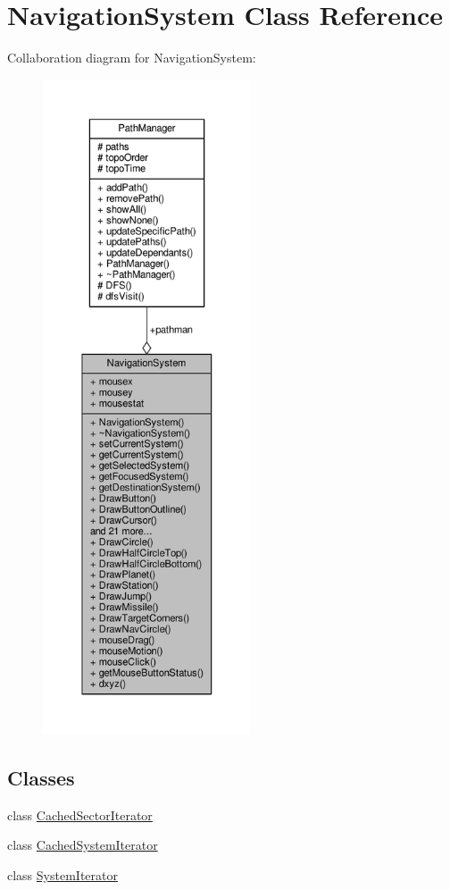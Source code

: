 \hypertarget{classNavigationSystem}{}\section{Navigation\+System Class Reference}
\label{classNavigationSystem}


Collaboration diagram for Navigation\+System\+:
\nopagebreak
\begin{figure}[H]
\begin{center}
\leavevmode
\includegraphics[height=550pt]{de/d4c/classNavigationSystem__coll__graph}
\end{center}
\end{figure}
\subsection*{Classes}
\begin{DoxyCompactItemize}
\item 
class \hyperlink{classNavigationSystem_1_1CachedSectorIterator}{Cached\+Sector\+Iterator}
\item 
class \hyperlink{classNavigationSystem_1_1CachedSystemIterator}{Cached\+System\+Iterator}
\item 
class \hyperlink{classNavigationSystem_1_1SystemIterator}{System\+Iterator}
\end{DoxyCompactItemize}
